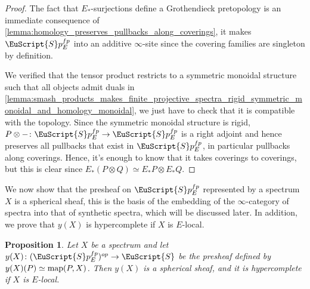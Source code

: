 \documentclass[oneside,a4paper]{amsart}
\newcommand{\euscr}[1]{\EuScript{#1}} %
\newcommand{\map}{\textnormal{map}} %
\newcommand{\spaces}{\euscr{S}} %
\newcommand{\spectra}{\euscr{S}p} %
\newcommand{\spectrafp}{\spectra_{E}^{fp}} %
\theoremstyle{plain}
\newtheorem{prop}[thm]{Proposition}
\theoremstyle{definition}
\theoremstyle{remark}
\begin{document}
\begin{proof}
The fact that $E_{*}$-surjections define a Grothendieck pretopology is an immediate consequence of \cref{lemma:homology_preserves_pullbacks_along_coverings}, it makes $\spectrafp$ into an additive $\infty$-site since the covering families are singleton by definition. 

We verified that the tensor product restricts to a  symmetric monoidal structure such that all objects admit duals in \cref{lemma:smash_products_makes_finite_projective_spectra_rigid_symmetric_monoidal_and_homology_monoidal}, we just have to check that it is compatible with the topology. Since the symmetric monoidal structure is rigid, $P \otimes - \colon \spectrafp \rightarrow \spectrafp$ is a right adjoint and hence preserves all pullbacks that exist in $\spectrafp$, in particular pullbacks along coverings. Hence, it's enough to know that it takes coverings to coverings, but this is clear since $E_{*}(P \otimes Q) \simeq E_{*}P \otimes E_{*}Q$.
\end{proof}
We now show that the presheaf on $\spectrafp$ represented by a spectrum $X$ is a spherical sheaf, this is the basis of the embedding of the $\infty$-category of spectra into that of synthetic spectra, which will be discussed later. In addition, we prove that $y(X)$ is hypercomplete if $X$ is $E$-local.

\begin{prop}
\label{prop:spectra_define_sheaves_on_finite_projective_spectra}
Let $X$ be a spectrum and let $y(X) \colon (\spectrafp)^{op} \rightarrow \spaces$ be the presheaf defined by $y(X)(P) \simeq \map(P, X)$. Then $y(X)$ is a spherical sheaf, and it is hypercomplete if $X$ is $E$-local. 
\end{prop}
\end{document}

